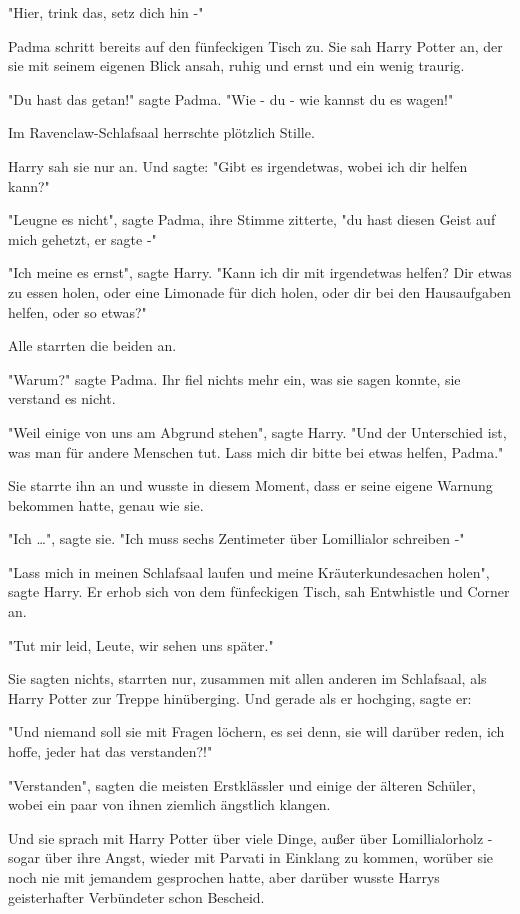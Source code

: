 {"Hier, trink das, setz dich hin -"

Padma schritt bereits auf den fünfeckigen Tisch zu. Sie sah Harry Potter an, der sie mit seinem eigenen Blick ansah, ruhig und ernst und ein wenig traurig.

"Du hast das getan!" sagte Padma. "Wie - du - wie kannst du es wagen!"

Im Ravenclaw-Schlafsaal herrschte plötzlich Stille.

Harry sah sie nur an. Und sagte: "Gibt es irgendetwas, wobei ich dir helfen kann?"

"Leugne es nicht", sagte Padma, ihre Stimme zitterte, "du hast diesen Geist auf mich gehetzt, er sagte -"

"Ich meine es ernst", sagte Harry. "Kann ich dir mit irgendetwas helfen? Dir etwas zu essen holen, oder eine Limonade für dich holen, oder dir bei den Hausaufgaben helfen, oder so etwas?"

Alle starrten die beiden an.

"Warum?" sagte Padma. Ihr fiel nichts mehr ein, was sie sagen konnte, sie verstand es nicht.

"Weil einige von uns am Abgrund stehen", sagte Harry. "Und der Unterschied ist, was man für andere Menschen tut. Lass mich dir bitte bei etwas helfen, Padma."

Sie starrte ihn an und wusste in diesem Moment, dass er seine eigene Warnung bekommen hatte, genau wie sie.

"Ich …", sagte sie. "Ich muss sechs Zentimeter über Lomillialor schreiben -"

"Lass mich in meinen Schlafsaal laufen und meine Kräuterkundesachen holen", sagte Harry. Er erhob sich von dem fünfeckigen Tisch, sah Entwhistle und Corner an.

"Tut mir leid, Leute, wir sehen uns später."

Sie sagten nichts, starrten nur, zusammen mit allen anderen im Schlafsaal, als Harry Potter zur Treppe hinüberging. Und gerade als er hochging, sagte er:

"Und niemand soll sie mit Fragen löchern, es sei denn, sie will darüber reden, ich hoffe, jeder hat das verstanden?!"

"Verstanden", sagten die meisten Erstklässler und einige der älteren Schüler, wobei ein paar von ihnen ziemlich ängstlich klangen.

Und sie sprach mit Harry Potter über viele Dinge, außer über Lomillialorholz - sogar über ihre Angst, wieder mit Parvati in Einklang zu kommen, worüber sie noch nie mit jemandem gesprochen hatte, aber darüber wusste Harrys geisterhafter Verbündeter schon Bescheid.

}
